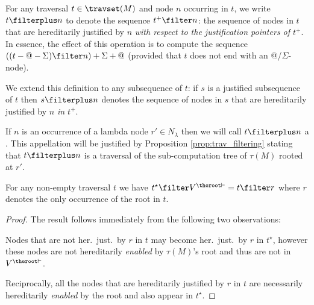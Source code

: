 For any traversal $t\in \travset(M)$ and node $n$ occurring in $t$,
we write $t \filterplus n$ to denote the sequence $t^+ \filter n$:
the sequence of nodes in $t$ that are hereditarily justified by $n$
\emph{with respect to the justification pointers of $t^+$}. In
essence, the effect of this operation is to compute the sequence
$((t-@-\Sigma)\filter n)+\Sigma+@$ (provided that $t$ does not end
with an @/$\Sigma$-node).

We extend this definition to any subsequence of $t$: if $s$ is a
justified subsequence of $t$ then $s \filterplus n$ denotes the
sequence of nodes in $s$ that are hereditarily justified by $n$
\emph{in $t^+$}.


If $n$ is an occurrence of a lambda node $r' \in N_\lambda$ then we
will call $t \filterplus n$ a . This appellation will be justified by
Proposition \ref{prop:trav_filtering} stating that $t \filterplus n$
is a traversal of the sub-computation tree of $\tau(M)$ rooted at
$r'$.
\bigskip


\begin{lemma}
\label{lem:he_filter_root_is_hj_filter_r}
For any non-empty traversal $t$ we have  $t^\star\filter V^{\theroot\vdash} = t \filter r$
where $r$ denotes the only occurrence of the root in $t$.
\end{lemma}
\begin{proof}
The result follows immediately from the following two observations:

Nodes that are not her.\ just.\ by $r$ in $t$ may become
her.\ just.\ by $r$ in $t^\star$, however these nodes are not hereditarily \emph{enabled}
 by $\tau(M)$'s root and thus are not in $V^{\theroot\vdash}$.

Reciprocally, all the nodes that are hereditarily justified by $r$ in $t$ are necessarily
hereditarily \emph{enabled} by the root and also appear in $t^\star$.
\end{proof}



